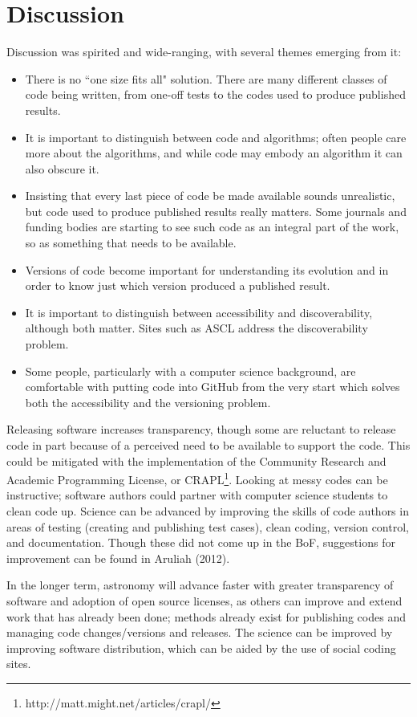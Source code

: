 \documentclass[11pt,twoside]{article}
\begin{document}
\section{Discussion}

Discussion was spirited and wide-ranging, with several themes emerging from it: 
\begin{itemize}
\item There is no ``one size fits all" solution. There are many different classes of code being written, from one-off tests to the codes used to produce published results.
\item It is important to distinguish between code and algorithms; often people care more about the algorithms, and while code may embody an algorithm it can also obscure it.
\item  Insisting that every last piece of code be made available sounds unrealistic, but code used to produce published results really matters. Some journals and funding bodies are starting to see such code as an integral part of the work, so as something that needs to be available.
\item Versions of code become important for understanding its evolution and in order to know just which version produced a published result.
\item It is important to distinguish between accessibility and discoverability, although both matter. Sites such as ASCL address the discoverability problem.
\item Some people, particularly with a computer science background, are comfortable with putting code into GitHub from the very start which solves both the accessibility and the versioning problem.
\end{itemize}

Releasing software increases transparency, though some are reluctant to release code in part because of a perceived need to be available to support the code. This could be mitigated with the implementation of the Community Research and Academic Programming License, or CRAPL\footnote{http://matt.might.net/articles/crapl/}. Looking at messy codes can be instructive; software authors could partner with computer science students to clean code up. Science can be advanced by improving the skills of code authors in areas of testing (creating and publishing test cases), clean coding, version control, and documentation. Though these did not come up in the BoF, suggestions for improvement can be found in Aruliah (2012). 

In the longer term, astronomy will advance faster with greater transparency of software and adoption of open source licenses, as others can improve and extend work that has already been done; methods already exist for publishing codes and managing code changes/versions and releases. The science can be improved by improving software distribution, which can be aided by the use of social coding sites.
\end{document}
